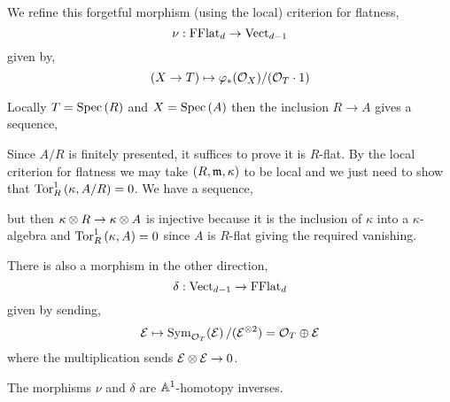 \documentclass[12pt]{article}
\begin{document}
We refine this forgetful morphism (using the local) criterion for flatness,
\[ \nu : \mathrm{FFlat}_d \to \mathrm{Vect}_{d-1} \]
given by,
\[ (X \to T) \mapsto \varphi_* (\mathcal{O}_{X}) / (\mathcal{O}_{T} \cdot 1) \]

\begin{rmk}
Locally $T = \mathrm{Spec}\left( R \right)$ and $X = \mathrm{Spec}\left( A \right)$ then the inclusion $R \to A$ gives a sequence,
\begin{center}
\end{center}
Since $A / R$ is finitely presented, it suffices to prove it is $R$-flat. By the local criterion for flatness we may take $(R, \mathfrak{m}, \kappa)$ to be local and we just need to show that $\mathrm{Tor}^{1}_{R} \left( \kappa, A/R \right) = 0$. We have a sequence,
\begin{center}
\end{center}
but then $\kappa \otimes R \to \kappa \otimes A$ is injective because it is the inclusion of $\kappa$ into a $\kappa$-algebra and $\mathrm{Tor}^{1}_{R} \left( \kappa, A \right) = 0$ since $A$ is $R$-flat giving the required vanishing.
\end{rmk}

There is also a morphism in the other direction,
\[ \delta : \mathrm{Vect}_{d-1} \to \mathrm{FFlat}_{d} \] 
given by sending,
\[ \mathcal{E} \mapsto \mathrm{Sym}_{\mathcal{O}_{T}}\! \left( \mathcal{E} \right) / (\mathcal{E}^{\otimes 2}) = \mathcal{O}_{T} \oplus \mathcal{E} \]
where the multiplication sends $\mathcal{E} \otimes \mathcal{E} \to 0$. 

\begin{prop}
The morphisms $\nu$ and $\delta$ are $\mathbb{A}^1$-homotopy inverses. 
\end{prop}
\end{document}
